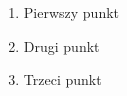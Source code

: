 \documentclass[12pt,a4paper,oneside]{book}
\begin{document}
	
	\begin{enumerate}[label=\arabic*.,leftmargin=*]
		\item Pierwszy punkt
		\item Drugi punkt
		\item Trzeci punkt
	\end{enumerate}
	
\end{document}
